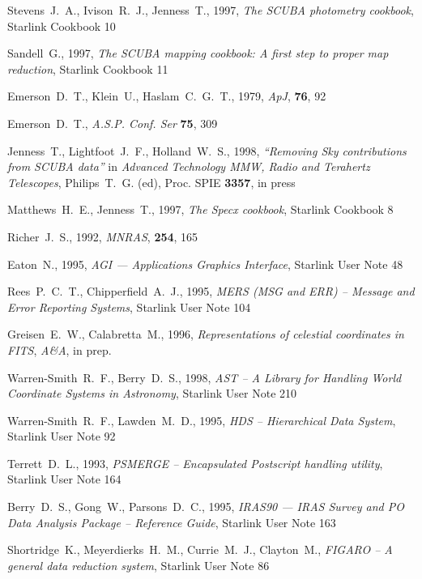 \documentclass[twoside,11pt]{article}
\newcommand{\xref}[3]{#1}
\renewcommand{\_}{\texttt{\symbol{95}}}
\begin{document}
\begin{thebibliography}{}
Stevens~J.~A., Ivison~R.~J., Jenness~T., 1997, {\it The SCUBA photometry 
cookbook},
\xref{Starlink Cookbook 10}{sc10}{}

Sandell~G., 1997, {\it The SCUBA mapping cookbook: A first step to
proper map reduction}, \xref{Starlink Cookbook 11}{sc11}{}

Emerson~D.~T., Klein~U., Haslam~C.~G.~T., 1979, {\it ApJ}, {\bf 76}, 92

Emerson~D.~T., \textit{A.S.P. Conf. Ser} \textbf{75}, 309

Jenness~T., Lightfoot~J.~F., Holland~W.~S., 1998, 
\textit{``Removing Sky contributions from SCUBA data''} in \textit{Advanced
Technology MMW, Radio and Terahertz Telescopes}, Philips~T.~G. (ed),
Proc. SPIE \textbf{3357}, in press

Matthews~H.~E., Jenness~T., 1997,
\textit{The Specx cookbook}, \xref{Starlink Cookbook 8}{sc8}{}

Richer~J.~S., 1992, {\it MNRAS}, {\bf 254}, 165

Eaton~N., 1995, {\it AGI --- Applications Graphics Interface},
\xref{Starlink User Note 48}{sun48}{}

Rees~P.~C.~T., Chipperfield~A.~J., 1995, {\it MERS (MSG and ERR) -- Message
and Error Reporting Systems}, \xref{Starlink User Note 104}{sun104}{}

Greisen~E.~W., Calabretta~M., 1996, {\it Representations of celestial
coordinates in FITS}, {\it A\&A}, in prep.

Warren-Smith~R.~F., Berry~D.~S., 1998, \textit{AST -- A Library for Handling
World Coordinate Systems in Astronomy},
\xref{Starlink User Note 210}{sun210}{}

Warren-Smith~R.~F., Lawden~M.~D., 1995, {\it HDS -- Hierarchical Data System},
\xref{Starlink User Note 92}{sun92}{}

Terrett~D.~L., 1993, {\it PSMERGE -- Encapsulated Postscript handling utility},
\xref{Starlink User Note 164}{sun164}{}

Berry~D.~S., Gong~W., Parsons~D.~C., 1995, {\it IRAS90 --- IRAS Survey and PO
Data Analysis Package -- Reference Guide}, \xref{Starlink User Note
163}{sun163}{} 

Shortridge~K., Meyerdierks~H.~M., Currie~M.~J., Clayton~M., 
{\it FIGARO -- A general data reduction system}, 
\xref{Starlink User Note 86}{sun86}{}


\end{thebibliography}
\end{document}
